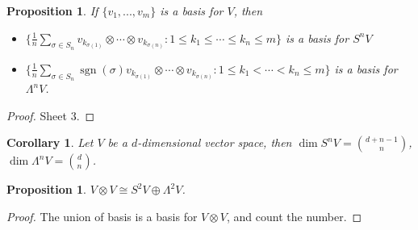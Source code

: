 \documentclass{article}
\theoremstyle{definition}
\theoremstyle{remark}
\theoremstyle{plain}
\newtheorem{prop}[defn]{Proposition}
\newtheorem{crly}[defn]{Corollary}
\begin{document}
\begin{prop}
    If $\{v_1,...,v_m\}$ is a basis for $V$, then 
    \begin{itemize}
        \item $\{\frac1n\sum_{\sigma\in S_n}v_{k_{\sigma(1)}}\otimes\cdots\otimes v_{k_{\sigma(n)}}:1\le k_1\le\cdots\le k_n\le m\}$ is a basis for $S^nV$
        \item $\{\frac1n\sum_{\sigma\in S_n}\operatorname{sgn}(\sigma)v_{k_{\sigma(1)}}\otimes\cdots\otimes v_{k_{\sigma(n)}}:1\le k_1<\cdots<k_n\le m\}$ is a basis for $\Lambda^nV$.
    \end{itemize}
\end{prop}
\begin{proof}
    Sheet 3.
\end{proof}
\begin{crly}
    Let $V$ be a $d$-dimensional vector space, then $\dim S^nV=\binom{d+n-1}{n}$, $\dim\Lambda^nV=\binom{d}{n}$.
\end{crly}
\begin{prop}
    $V\otimes V\cong S^2V\oplus\Lambda^2V$.
\end{prop}
\begin{proof}
    The union of basis is a basis for $V\otimes V$, and count the number.
\end{proof}
\end{document}
